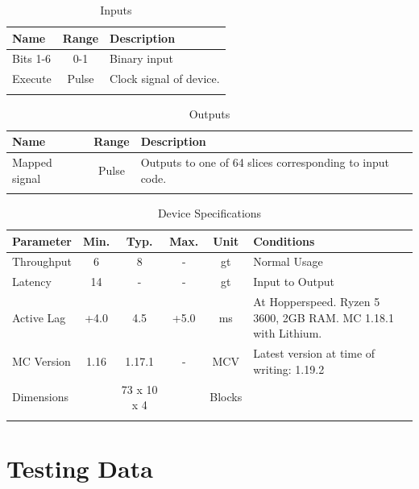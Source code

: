 \documentclass[10pt]{datasheet}
\begin{document}
\begin{table}[h]
    \caption{Inputs}
    \begin{tabularx}{\textwidth}{l | c | X}
        \thickhline
        \textbf{Name} & \textbf{Range} & \textbf{Description} \\
        \hline
        Bits 1-6 & 0-1 & Binary input \\
        \hline
        Execute & Pulse & Clock signal of device. \\
        \thickhline
\end{tabularx}
\end{table}

\begin{table}[h]
    \caption{Outputs}
    \begin{tabularx}{\textwidth}{l | c | X}
        \thickhline
        \textbf{Name} & \textbf{Range} & \textbf{Description} \\
        \hline
        Mapped signal & Pulse & Outputs to one of 64 slices corresponding to input code. \\
        \thickhline
\end{tabularx}
\end{table}

\begin{table}[h]
    \caption{Device Specifications}
    \begin{tabularx}{\textwidth}{l | c c c | c | X}
        \thickhline
        \textbf{Parameter} & \textbf{Min.} & \textbf{Typ.} & \textbf{Max.} &
        \textbf{Unit} & \textbf{Conditions} \\
        \hline
        Throughput  & 6 & 8 & - & gt & Normal Usage \\
        \hline
        Latency  & 14 & - & - & gt & Input to Output \\
        \hline
        Active Lag & +4.0 & 4.5 & +5.0 & ms & At Hopperspeed. Ryzen 5 3600, 2GB RAM. MC 1.18.1 with Lithium. \\
        \hline
        MC Version & 1.16 & 1.17.1 & - & MCV & Latest version at time of writing: 1.19.2\\
        \hline
        Dimensions & & 73 x 10 x 4 & & Blocks & \\
        \thickhline
\end{tabularx}
\end{table}

\newpage
\section{Testing Data}
\end{document}
